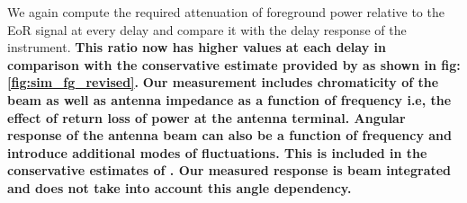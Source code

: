 \documentclass[twocolumn]{emulateapj}
\begin{document}
     We again compute the required attenuation of foreground power relative to the EoR signal at every delay and compare it with the delay response of the instrument. \textbf{This ratio now has higher values at each delay in comparison with the conservative estimate provided by \cite{Thyagarajan_et_al2016} as shown in fig: \ref{fig:sim_fg_revised}. }
     \textbf{Our measurement includes chromaticity of the beam as well as antenna impedance as a function of frequency i.e, the effect 
     of return loss of power at the antenna terminal. Angular response of the antenna beam 
     can also be a function of frequency and introduce additional modes of fluctuations. This is included in the conservative estimates of \cite{Thyagarajan_et_al2015}. Our
     measured response is beam integrated and does not take into account this angle dependency.}
      
\end{document}
